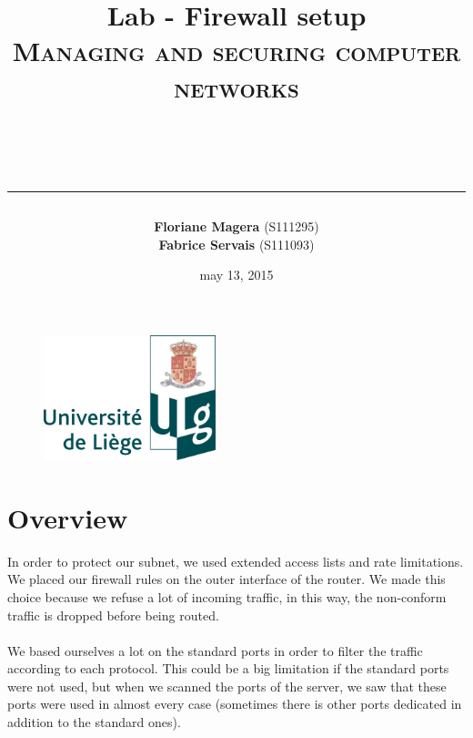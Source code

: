 \documentclass[a4paper,titlepage]{article}
\begin{document}
\begin{titlepage}

\begin{figure}
\centering
\includegraphics[width=5cm]{logo-ulg.png}
\end{figure}



\title{
\vspace{0.2cm}
\LARGE{\textbf{Lab - Firewall setup }} \\ \textsc{Managing and securing computer networks}
\author{\textbf{Floriane Magera} \small{(S111295})\\\textbf{Fabrice Servais} \small{(S111093})}\\
\date{may 13, 2015}
\rule{15cm}{1.5pt}
}

\end{titlepage}

\pagestyle{fancy}

\maketitle

\section{Overview}
In order to protect our subnet, we used extended access lists and rate limitations. We placed our firewall rules on the outer interface of the router. We made this choice because we refuse a lot of incoming traffic, in this way, the non-conform traffic is dropped before being routed.

\paragraph{}
 We based ourselves a lot on the standard ports in order to filter the traffic according to each protocol.  This could be a big  limitation if the standard ports were not used, but when we scanned the ports of the server, we saw that these ports were used in almost every case (sometimes there is other ports dedicated in addition to the standard ones). 
\end{document}

